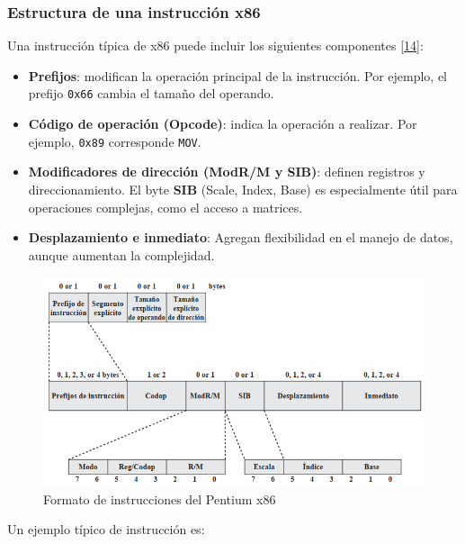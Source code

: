 \documentclass[12pt,oneside]{templates/unerthesis}
\providecommand{\tightlist}{%
  \setlength{\itemsep}{0pt}\setlength{\parskip}{0pt}}
\begin{document}
\hypertarget{estructura-de-una-instrucciuxf3n-x86}{%
\subsubsection{Estructura de una instrucción x86}\label{estructura-de-una-instrucciuxf3n-x86}}

Una instrucción típica de x86 puede incluir los siguientes componentes \protect\hyperlink{ref-stallings_computer_2013}{{[}14{]}}:

\begin{itemize}
\tightlist
\item
  \textbf{Prefijos}: modifican la operación principal de la instrucción. Por ejemplo, el prefijo \texttt{0x66} cambia el tamaño del operando.
\item
  \textbf{Código de operación (Opcode)}: indica la operación a realizar. Por ejemplo, \texttt{0x89} corresponde \texttt{MOV}.
\item
  \textbf{Modificadores de dirección (ModR/M y SIB)}: definen registros y direccionamiento. El byte \textbf{SIB} (Scale, Index, Base) es especialmente útil para operaciones complejas, como el acceso a matrices.
\item
  \textbf{Desplazamiento e inmediato}: Agregan flexibilidad en el manejo de datos, aunque aumentan la complejidad.
\end{itemize}

\begin{figure}

{\centering \includegraphics[width=1\linewidth]{images/formatoinstruccionx86} 

}

\caption{Formato de instrucciones del Pentium x86}\label{fig:FormatoInst}
\end{figure}

Un ejemplo típico de instrucción es:
\end{document}
